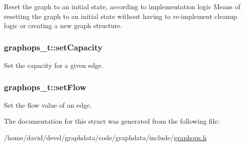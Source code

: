 Reset the graph to an initial state, according to implementation logic Means of resetting the graph to an initial state without having to re-\/implement cleanup logic or creating a new graph structure. 

\subsubsection[{\texorpdfstring{set\+Capacity}{setCapacity}}]{ graphops\+\_\+t\+::set\+Capacity}\hypertarget{structgraphops__t_a6f05f8daf75bc380988e20e019681c0a}{}\label{structgraphops__t_a6f05f8daf75bc380988e20e019681c0a}
Set the capacity for a given edge. 
\subsubsection[{\texorpdfstring{set\+Flow}{setFlow}}]{ graphops\+\_\+t\+::set\+Flow}\hypertarget{structgraphops__t_ad62e88e4ea9ffdae0c3fb681433e3d92}{}\label{structgraphops__t_ad62e88e4ea9ffdae0c3fb681433e3d92}
Set the flow value of an edge. 

The documentation for this struct was generated from the following file\+:\begin{DoxyCompactItemize}
\item 
/home/david/devel/graphdata/code/graphdata/include/\hyperlink{graphops_8h}{graphops.\+h}\end{DoxyCompactItemize}
